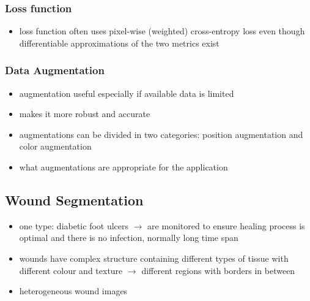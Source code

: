 
\subsubsection{Loss function}

\begin{itemize}
	\item loss function often uses pixel-wise (weighted) cross-entropy loss even though differentiable approximations of the two metrics exist \cite{Eelbode}
\end{itemize}


\subsubsection{Data Augmentation}

\begin{itemize}
	\item augmentation useful especially if available data is limited
	\item makes it more robust and accurate
	\item augmentations can be divided in two categories: position augmentation and color augmentation
	\item what augmentations are appropriate for the application
\end{itemize}



\subsection{Wound Segmentation}

\begin{itemize}
	\item one type: diabetic foot ulcers $\rightarrow$ are monitored to ensure healing process is optimal and there is no infection, normally long time span \cite{DFUC2022}
\end{itemize}

\begin{itemize}
	\item wounds have complex structure containing different types of tissue with different colour and texture $\rightarrow$ different regions with borders in between \cite{AhmadFauzi2015}
	\item heterogeneous wound images
\end{itemize}

